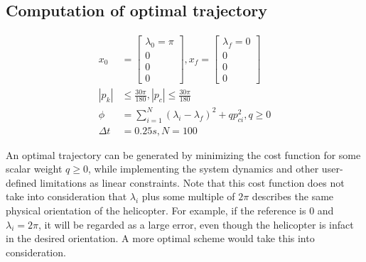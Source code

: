 \subsection{Computation of optimal trajectory}
\begin{equation}
\begin{aligned}
x_0 &= \begin{bmatrix} \lambda_0=\pi \\ 0 \\ 0 \\ 0 \end{bmatrix}, x_f=\begin{bmatrix} \lambda_f=0 \\ 0 \\ 0 \\0 \end{bmatrix}
\\
| p_k | & \leq \frac{30\pi}{180}, | p_c | \leq \frac{30\pi}{180}
\\
\phi &= \sum_{i=1}^{N}(\lambda_i - \lambda_f)^2 + qp_{ci}^2,q \geq 0
\\
\Delta t &= 0.25s, N=100
\end{aligned}
\end{equation}


An optimal trajectory can be generated by minimizing the cost function for some scalar weight $q \geq 0$, while implementing the system dynamics and other user-defined limitations as linear constraints.
Note that this cost function does not take into consideration that $\lambda_i$ plus some multiple of $2\pi$ describes the same physical orientation of the helicopter. For example, if the reference is $0$ and $\lambda_i = 2\pi$, it will be regarded as a large error, even though the helicopter is infact in the desired orientation. A more optimal scheme would take this into consideration.